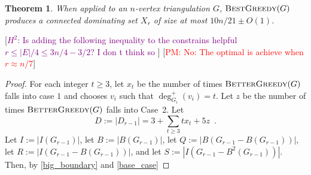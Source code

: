 \documentclass[12pt]{article}
\newtheorem{thm}{Theorem}
\theoremstyle{definition}
\newcommand{\pat}[1]{[\textcolor{red}{PM: #1}]}
\newcommand{\hussein}[1]{[\textcolor{purple}{$H^2$: #1}]}
\begin{document}
\begin{thm}\label{best_greedy}
  When applied to an $n$-vertex triangulation $G$,  $\textsc{BestGreedy}(G)$ produces a connected dominating set $X_r$ of size at most $10n/21\pm O(1)$.
\end{thm}
\hussein{Is adding the following inequality to the constrains helpful  $r \leq |E|/4 \leq 3n/4 - 3/2$? I don t think so  } \pat{No: The optimal is achieve when $r\approx n/7$}
\begin{proof}
  For each integer $t\ge 3$, let $x_t$ be the number of times $\textsc{BetterGreedy}(G)$ falls into case $1$ and chooses $v_i$ such that $\deg^+_{G_i}(v_i)=t$.  Let $z$ be the number of times $\textsc{BetterGreedy}(G)$ falls into Case~2.  Let
  \[
     D:=|D_{r-1}| = 3 + \sum_{t\ge 3}tx_t + 5z \enspace .
  \]
  Let $I:=|I(G_{r-1})|$, let $B:=|B(G_{r-1})|$, let $Q:=|B(G_{r-1}-B(G_{r-1}))|$, let $R:=|I(G_{r-1}-B(G_{r-1}))|$, and let $S:=|I(G_{r-1}-B^2(G_{r-1}))|$.  Then, by \cref{big_boundary} and \cref{base_case}


\end{proof}
\end{document}
